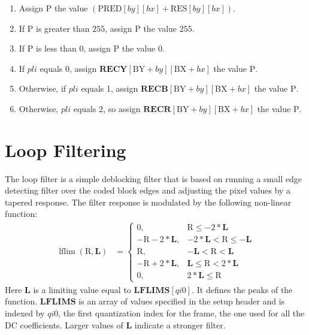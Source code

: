 \documentclass[9pt,letterpaper]{book}
\newcommand{\idx}[1]{{\ensuremath{\mathit{#1}}}}
\newcommand{\pli}{\idx{pli}}
\newcommand{\bitvar}[1]{\ensuremath{\mathbf{\bm{#1}}}}
\newcommand{\locvar}[1]{\ensuremath{\mathrm{#1}}}
\newcommand{\lflim}{\ensuremath{\mathop{\mathrm{lflim}}\nolimits}}
\numberwithin{equation}{chapter}
\numberwithin{figure}{chapter}
\numberwithin{table}{chapter}
\begin{document}
\begin{enumerate}
\begin{enumerate}
\begin{enumerate}
\item
Assign \locvar{P} the value
 $(\locvar{PRED}[\locvar{\idx{by}}][\locvar{\idx{bx}}]+
 \locvar{RES}[\locvar{\idx{by}}][\locvar{\idx{bx}}])$.
\item
If \locvar{P} is greater than $255$, assign \locvar{P} the value $255$.
\item
If \locvar{P} is less than $0$, assign \locvar{P} the value $0$.
\item
If \locvar{\pli} equals 0, assign
 $\bitvar{RECY}[\locvar{BY}+\locvar{\idx{by}}][\locvar{BX}+\locvar{\idx{bx}}]$
 the value \locvar{P}.
\item
Otherwise, if \locvar{\pli} equals 1, assign
 $\bitvar{RECB}[\locvar{BY}+\locvar{\idx{by}}][\locvar{BX}+\locvar{\idx{bx}}]$
 the value \locvar{P}.
\item
Otherwise, \locvar{\pli} equals 2, so assign
 $\bitvar{RECR}[\locvar{BY}+\locvar{\idx{by}}][\locvar{BX}+\locvar{\idx{bx}}]$
 the value \locvar{P}.
\end{enumerate}
\end{enumerate}
\end{enumerate}

\section{Loop Filtering}
\label{sec:loopfilter}

The loop filter is a simple deblocking filter that is based on running a small
 edge detecting filter over the coded block edges and adjusting the pixel
 values by a tapered response.
The filter response is modulated by the following non-linear function:
\begin{align*}
\lflim(\locvar{R},\bitvar{L})&=\left\{\begin{array}{ll}
0,                        & \locvar{R}\le-2*\bitvar{L} \\
-\locvar{R}-2*\bitvar{L}, & -2*\bitvar{L}<\locvar{R}\le-\bitvar{L} \\
\locvar{R},               & -\bitvar{L}<\locvar{R}<\bitvar{L} \\
-\locvar{R}+2*\bitvar{L}, & \bitvar{L}\le\locvar{R}<2*\bitvar{L} \\
0,                        & 2*\bitvar{L}\le\locvar{R}
\end{array}\right.
\end{align*}
Here \bitvar{L} is a limiting value equal to $\bitvar{LFLIMS}[\idx{qi0}]$.
It defines the peaks of the function.
\bitvar{LFLIMS} is an array of values specified in the setup header and is
 indexed by \idx{qi0}, the first quantization index for the frame, the one used
 for all the DC coefficients.
Larger values of \bitvar{L} indicate a stronger filter.
\end{document}
